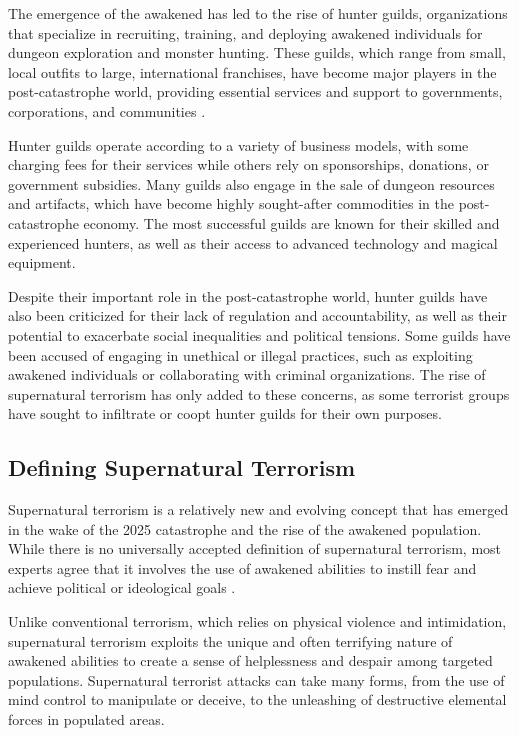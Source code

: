 \documentclass[12pt, a4paper]{article}
\begin{document}
The emergence of the awakened has led to the rise of hunter guilds, organizations that specialize in recruiting, training, and deploying awakened individuals for dungeon exploration and monster hunting. These guilds, which range from small, local outfits to large, international franchises, have become major players in the post-catastrophe world, providing essential services and support to governments, corporations, and communities \citep{Liu2026}.

Hunter guilds operate according to a variety of business models, with some charging fees for their services while others rely on sponsorships, donations, or government subsidies. Many guilds also engage in the sale of dungeon resources and artifacts, which have become highly sought-after commodities in the post-catastrophe economy. The most successful guilds are known for their skilled and experienced hunters, as well as their access to advanced technology and magical equipment.

Despite their important role in the post-catastrophe world, hunter guilds have also been criticized for their lack of regulation and accountability, as well as their potential to exacerbate social inequalities and political tensions. Some guilds have been accused of engaging in unethical or illegal practices, such as exploiting awakened individuals or collaborating with criminal organizations. The rise of supernatural terrorism has only added to these concerns, as some terrorist groups have sought to infiltrate or coopt hunter guilds for their own purposes.

\subsection{Defining Supernatural Terrorism}
Supernatural terrorism is a relatively new and evolving concept that has emerged in the wake of the 2025 catastrophe and the rise of the awakened population. While there is no universally accepted definition of supernatural terrorism, most experts agree that it involves the use of awakened abilities to instill fear and achieve political or ideological goals \citep{Hoffman2026}.

Unlike conventional terrorism, which relies on physical violence and intimidation, supernatural terrorism exploits the unique and often terrifying nature of awakened abilities to create a sense of helplessness and despair among targeted populations. Supernatural terrorist attacks can take many forms, from the use of mind control to manipulate or deceive, to the unleashing of destructive elemental forces in populated areas.
\end{document}
